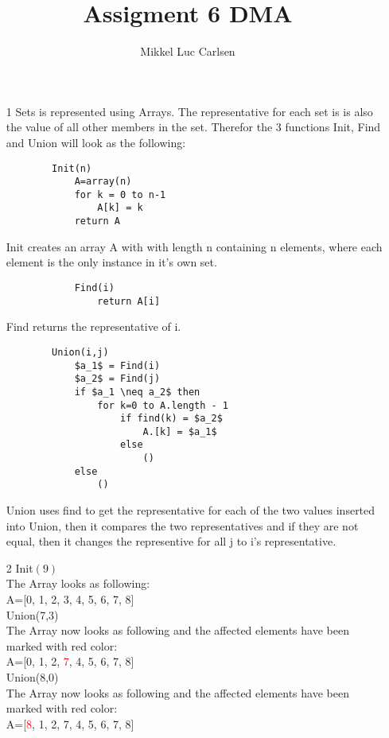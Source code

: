 \documentclass[a4paper]{article}
\title{Assigment 6 DMA}
\author{Mikkel Luc Carlsen}
\begin{document}
\maketitle

\begin{itemize}[label=(\arabic*)]
    \item[1] Sets is represented using Arrays. The representative for each set is is also the value of all other members in the set.
        Therefor the 3 functions Init, Find and Union will look as the following:
        \begin{verbatim}
        Init(n)
            A=array(n)
            for k = 0 to n-1
                A[k] = k
            return A
        \end{verbatim}
        Init creates an array A with with length n containing n elements, where each element is the only instance in it's own set.
        \begin{verbatim}
            Find(i)
                return A[i]
        \end{verbatim}
        Find returns the representative of i.
        \begin{lstlisting}
        Union(i,j)
            $a_1$ = Find(i)
            $a_2$ = Find(j)
            if $a_1 \neq a_2$ then
                for k=0 to A.length - 1
                    if find(k) = $a_2$
                        A.[k] = $a_1$
                    else
                        ()
            else
                ()
        \end{lstlisting}    
        Union uses find to get the representative for each of the two values inserted into Union, then it compares the two 
        representatives and if they are not equal, then it changes the representive for all j to i's representative.

    \item[2] 
        Init$(9)$ \\
        The Array looks as following: \\
        A=[0, 1, 2, 3, 4, 5, 6, 7, 8] \\

        Union(7,3) \\
        The Array now looks as following and the affected elements have been marked with red color:\\
        A=[0, 1, 2, \textcolor{red}{7}, 4, 5, 6, 7, 8]\\

        Union(8,0)\\
        The Array now looks as following and the affected elements have been marked with red color:\\
        A=[\textcolor{red}{8}, 1, 2, 7, 4, 5, 6, 7, 8]\\


\end{itemize}
\end{document}
